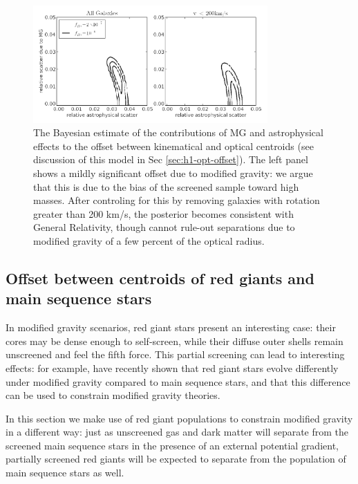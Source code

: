 \documentclass[useAMS,usenatbib,twocolumn]{mn2e}
\begin{document}
\begin{figure}
\begin{center}
  \includegraphics[width=0.8\textwidth]{figures/sec4_2_offset.png}
  \caption{The Bayesian estimate of the contributions of MG and astrophysical
effects to the offset between kinematical and optical centroids
(see discussion of this model in Sec \ref{sec:h1-opt-offset}).  The left
    panel shows a mildly significant offset due to modified gravity:
    we argue that this is due to the bias of the screened sample toward
    high masses.  After controling for this by removing galaxies
    with rotation greater than 200 km/s, the posterior becomes
    consistent with General Relativity, though cannot rule-out
    separations due to modified gravity of a few percent of the optical
    radius.}
  \label{offset-kin-den-2}
\end{center}
\end{figure}







\subsection{Offset between centroids of red giants and main sequence stars}
\label{sec:rgb}
In modified gravity scenarios, red giant stars present an interesting case:
their cores may be dense enough to self-screen, while their diffuse outer
shells remain unscreened and feel the fifth force.  This partial screening
can lead to interesting effects: for example, 
\citet{changhui} have recently shown that red giant stars evolve differently
under modified gravity compared to main sequence stars, and that this
difference can be used to constrain modified gravity theories.

In this section we make use of red giant populations
to constrain modified gravity in a different way:
just as unscreened gas and dark matter will separate from
the screened main sequence stars in the presence
of an external potential gradient, partially screened red giants
will be expected to separate from the population
of main sequence stars as well.
\end{document}

